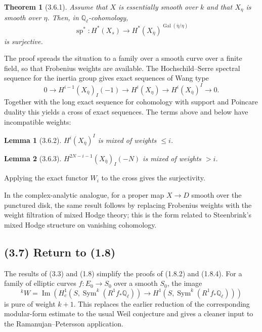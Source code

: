 \documentclass[11pt]{article}
\newtheorem{theorem}{Theorem}
\newtheorem{lemma}{Lemma}
\theoremstyle{remark}
\newcommand{\Ql}{\mathbb{Q}_\ell}
\newcommand{\Gal}{\operatorname{Gal}}
\begin{document}
\begin{theorem}[3.6.1]
Assume that $X$ is essentially smooth over $k$ and that $X_\eta$ is smooth over $\eta$. Then, in $\Ql$-cohomology,
\[
\operatorname{sp}^*:H^*(X_s)\longrightarrow H^*(X_{\bar\eta})^{\Gal(\bar\eta/\eta)}
\]
is surjective.
\end{theorem}

The proof spreads the situation to a family over a smooth curve over a finite field, so that Frobenius weights are available. The Hochschild--Serre spectral sequence for the inertia group gives exact sequences of Wang type
\begin{equation}\tag{3.6.1.5}
0\to H^{i-1}(X_{\bar\eta})_I(-1)\to H^i(X_\eta)\to H^i(X_{\bar\eta})^I\to0 .
\end{equation}
Together with the long exact sequence for cohomology with support and Poincare duality this yields a cross of exact sequences. The terms above and below have incompatible weights:
\begin{lemma}[3.6.2]
$H^i(X_{\bar\eta})^I$ is mixed of weights $\le i$.
\end{lemma}
\begin{lemma}[3.6.3]
$H^{2N-i-1}(X_{\bar\eta})_I(-N)$ is mixed of weights $>i$.
\end{lemma}
Applying the exact functor $W_i$ to the cross gives the surjectivity.

In the complex-analytic analogue, for a proper map $X\to D$ smooth over the punctured disk, the same result follows by replacing Frobenius weights with the weight filtration of mixed Hodge theory; this is the form related to Steenbrink's mixed Hodge structure on vanishing cohomology.

\subsection*{(3.7) Return to (1.8)}

The results of (3.3) and (1.8) simplify the proofs of (1.8.2) and (1.8.4). For a family of elliptic curves $f:E_0\to S_0$ over a smooth $S_0$, the image
\[
{}^kW=\operatorname{Im}\left(H^1_c(S,\operatorname{Sym}^k(R^1f_{*}\Ql))\to H^1(S,\operatorname{Sym}^k(R^1f_{*}\Ql))\right)
\]
is pure of weight $k+1$. This replaces the earlier reduction of the corresponding modular-form estimate to the usual Weil conjecture and gives a cleaner input to the Ramanujan--Petersson application.
\end{document}
